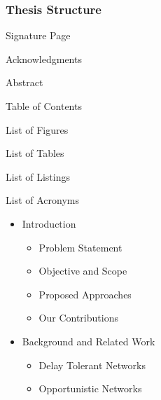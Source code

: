 \documentclass{beamer}
\begin{document}
\begin{frame}
\frametitle{Thesis Structure}

\begin{list}{-}{Chapter Title}
\item Signature Page 
\item  Acknowledgments 
\item  Abstract 
\item  Table of Contents 
\item  List of Figures 
\item  List of Tables 
\item List of Listings 
\item List of Acronyms
\end{list}

\begin{itemize}
\item Introduction 
\begin{itemize}
\item  Problem Statement 
\item  Objective and Scope 
\item  Proposed Approaches 
\item  Our Contributions 
\end{itemize}
\item  Background and Related Work 
\begin{itemize}
 	\item  Delay Tolerant Networks
	\item  Opportunistic Networks 
\end{itemize}
\end{itemize}
\end{frame}
\end{document}
